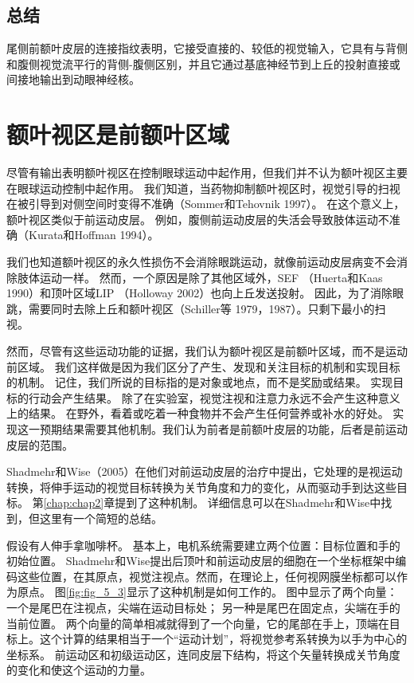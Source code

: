\subsection{总结}

尾侧前额叶皮层的连接指纹表明，它接受直接的、较低的视觉输入，它具有与背侧和腹侧视觉流平行的背侧-腹侧区别，并且它通过基底神经节到上丘的投射直接或间接地输出到动眼神经核。



\section{额叶视区是前额叶区域}

尽管有输出表明额叶视区在控制眼球运动中起作用，但我们并不认为额叶视区主要在眼球运动控制中起作用。
我们知道，当药物抑制额叶视区时，视觉引导的扫视在被引导到对侧空间时变得不准确（Sommer和Tehovnik 1997）。
在这个意义上，额叶视区类似于前运动皮层。
例如，腹侧前运动皮层的失活会导致肢体运动不准确（Kurata和Hoffman 1994）。


我们也知道额叶视区的永久性损伤不会消除眼跳运动，就像前运动皮层病变不会消除肢体运动一样。
然而，一个原因是除了其他区域外，SEF （Huerta和Kaas 1990）和顶叶区域LIP （Holloway 2002）也向上丘发送投射。
因此，为了消除眼跳，需要同时去除上丘和额叶视区（Schiller等 1979，1987）。只剩下最小的扫视。


然而，尽管有这些运动功能的证据，我们认为额叶视区是前额叶区域，而不是运动前区域。
我们这样做是因为我们区分了产生、发现和关注目标的机制和实现目标的机制。
记住，我们所说的目标指的是对象或地点，而不是奖励或结果。
实现目标的行动会产生结果。
除了在实验室，视觉注视和注意力永远不会产生这种意义上的结果。
在野外，看着或吃着一种食物并不会产生任何营养或补水的好处。
实现这一预期结果需要其他机制。我们认为前者是前额叶皮层的功能，后者是前运动皮层的范围。


Shadmehr和Wise（2005）在他们对前运动皮层的治疗中提出，它处理的是视运动转换，将伸手运动的视觉目标转换为关节角度和力的变化，从而驱动手到达这些目标。
第\ref{chap:chap2}章提到了这种机制。
详细信息可以在Shadmehr和Wise中找到，但这里有一个简短的总结。


假设有人伸手拿咖啡杯。
基本上，电机系统需要建立两个位置：目标位置和手的初始位置。
Shadmehr和Wise提出后顶叶和前运动皮层的细胞在一个坐标框架中编码这些位置，在其原点，视觉注视点。然而，在理论上，任何视网膜坐标都可以作为原点。
图\ref{fig:fig_5_3}显示了这种机制是如何工作的。
图中显示了两个向量：一个是尾巴在注视点，尖端在运动目标处；
另一种是尾巴在固定点，尖端在手的当前位置。
两个向量的简单相减就得到了一个向量，它的尾部在手上，顶端在目标上。这个计算的结果相当于一个“运动计划”，将视觉参考系转换为以手为中心的坐标系。
前运动区和初级运动区，连同皮层下结构，将这个矢量转换成关节角度的变化和使这个运动的力量。


